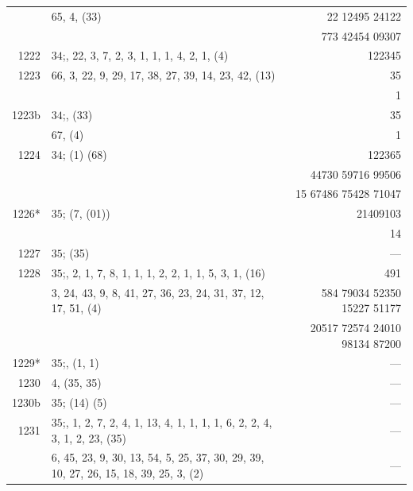 \documentclass[11pt]{article}
\begin{document}
{\begin{longtable}{|r|p{8.5cm}|r|}
       & 65, 4, (33) & 22 12495 24122 \\
       & & 773 42454 09307 \\
\hline
1222   & $34$;\; 1, 22, 3, 7, 2, 3, 1, 1, 1, 4, 2, 1, (4) & 122345 \\
\hline
1223   & 66, 3, 22, 9, 29, 17, 38, 27, 39, 14, 23, 42, (13) & 35 \\
       & & 1 \\
\hline
1223b  & $34$;\; 1, (33) & 35 \\
       & 67, (4) & 1 \\
\hline
1224   & $34$;\; (1) (68) & 122365 \\
       & & 44730 59716 99506 \\
       & & 15 67486 75428 71047 \\
\hline
1226*  & $35$;\; (7, (01)) & 21409103 \\
       & & 14 \\
\hline
1227   & $35$;\; (35) & --- \\
\hline
1228   & $35$;\; 23, 2, 1, 7, 8, 1, 1, 1, 2, 2, 1, 1, 5, 3, 1, (16) & 491 \\
\hline
       & 3, 24, 43, 9, 8, 41, 27, 36, 23, 24, 31, 37, 12, 17, 51, (4) & 584 79034 52350 15227 51177 \\
       & & 20517 72574 24010 98134 87200 \\
\hline
1229*  & $35$;\; 17, (1, 1) & --- \\
1230   & 4, (35, 35) & --- \\
\hline
1230b  & $35$;\; (14) (5) & --- \\
\hline
1231   & $35$;\; 11, 1, 2, 7, 2, 4, 1, 13, 4, 1, 1, 1, 1, 6, 2, 2, 4, 3, 1, 2, 23, (35) & --- \\
       & 6, 45, 23, 9, 30, 13, 54, 5, 25, 37, 30, 29, 39, 10, 27, 26, 15, 18, 39, 25, 3, (2) & --- \\
\hline
\end{longtable}
}
\end{document}
